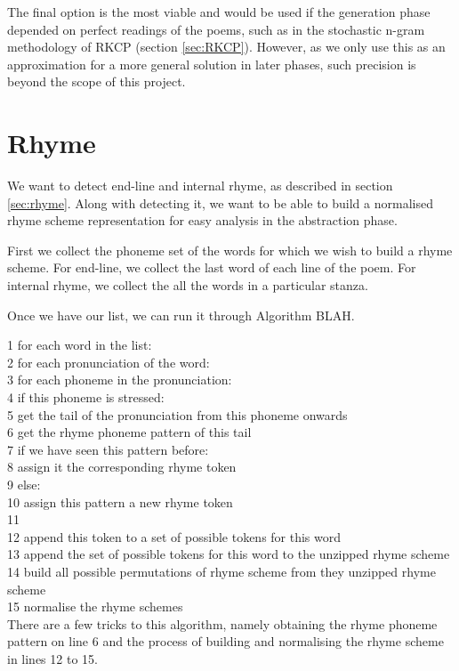 The final option is the most viable and would be used if the generation phase depended on perfect readings of the poems, such as in the stochastic n-gram methodology of RKCP (section \ref{sec:RKCP}). However, as we only use this as an approximation for a more general solution in later phases, such precision is beyond the scope of this project.


\section{Rhyme}

We want to detect end-line and internal rhyme, as described in section \ref{sec:rhyme}. Along with detecting it, we want to be able to build a normalised rhyme scheme representation for easy analysis in the abstraction phase. 

First we collect the phoneme set of the words for which we wish to build a rhyme scheme. For end-line, we collect the last word of each line of the poem. For internal rhyme, we collect the all the words in a particular stanza.

Once we have our list, we can run it through Algorithm BLAH.

1 for each word in the list:\\
2 	for each pronunciation of the word:\\
3		for each phoneme in the pronunciation:\\
4			if this phoneme is stressed:\\
5				get the tail of the pronunciation from this phoneme onwards\\
6				get the rhyme phoneme pattern of this tail\\
7				if we have seen this pattern before: \\
8					assign it the corresponding rhyme token\\
9				else:\\
10					assign this pattern a new rhyme token\\
11				\\
12				append this token to a set of possible tokens for this word\\				
13	append the set of possible tokens for this word to the unzipped rhyme scheme\\
14 build all possible permutations of rhyme scheme from they unzipped rhyme scheme\\
15 normalise the rhyme schemes\\
	
There are a few tricks to this algorithm, namely obtaining the rhyme phoneme pattern on line 6 and the process of building and normalising the rhyme scheme in lines 12 to 15.

